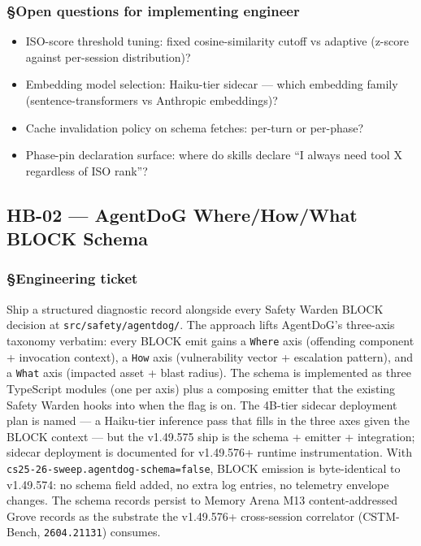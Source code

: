\documentclass[11pt,letterpaper]{article}
\newcommand{\arxivid}[1]{\texttt{\textcolor{accent}{#1}}}
\providecommand{\tightlist}{\setlength{\itemsep}{0pt}\setlength{\parskip}{0pt}}
\begin{document}
\subsubsection{§Open questions for implementing
engineer}

\begin{itemize}
\tightlist
\item
  ISO-score threshold tuning: fixed cosine-similarity cutoff vs adaptive
  (z-score against per-session distribution)?
\item
  Embedding model selection: Haiku-tier sidecar --- which embedding
  family (sentence-transformers vs Anthropic embeddings)?
\item
  Cache invalidation policy on schema fetches: per-turn or per-phase?
\item
  Phase-pin declaration surface: where do skills declare ``I always need
  tool X regardless of ISO rank''?
\end{itemize}


\subsection{HB-02 — AgentDoG Where/How/What BLOCK Schema}
\subsubsection{§Engineering ticket}

Ship a structured diagnostic record alongside every Safety Warden BLOCK
decision at \texttt{src/safety/agentdog/}. The approach lifts AgentDoG's
three-axis taxonomy verbatim: every BLOCK emit gains a \texttt{Where}
axis (offending component + invocation context), a \texttt{How} axis
(vulnerability vector + escalation pattern), and a \texttt{What} axis
(impacted asset + blast radius). The schema is implemented as three
TypeScript modules (one per axis) plus a composing emitter that the
existing Safety Warden hooks into when the flag is on. The 4B-tier
sidecar deployment plan is named --- a Haiku-tier inference pass that
fills in the three axes given the BLOCK context --- but the v1.49.575
ship is the schema + emitter + integration; sidecar deployment is
documented for v1.49.576+ runtime instrumentation. With
\texttt{cs25-26-sweep.agentdog-schema=false}, BLOCK emission is
byte-identical to v1.49.574: no schema field added, no extra log
entries, no telemetry envelope changes. The schema records persist to
Memory Arena M13 content-addressed Grove records as the substrate the
v1.49.576+ cross-session correlator (CSTM-Bench, \arxivid{2604.21131})
consumes.
\end{document}
